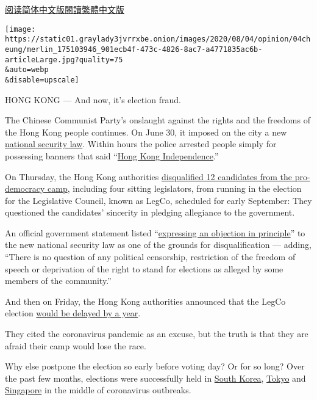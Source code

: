 \href{https://cn.nytimes3xbfgragh.onion/opinion/20200803/hong-kong-election-china/}{阅读简体中文版}\href{https://cn.nytimes3xbfgragh.onion/opinion/20200803/hong-kong-election-china/zh-hant/}{閱讀繁體中文版}

\texttt{[image: https://static01.graylady3jvrrxbe.onion/images/2020/08/04/opinion/04cheung/merlin\_175103946\_901ecb4f-473c-4826-8ac7-a4771835ac6b-articleLarge.jpg?quality=75\\\&auto=webp\\\&disable=upscale]}

HONG KONG --- And now, it's election fraud.

The Chinese Communist Party's onslaught against the rights and the
freedoms of the Hong Kong people continues. On June 30, it imposed on
the city a new
\href{https://www.gld.gov.hk/egazette/pdf/20202448e/egn2020244872.pdf}{national
security law}. Within hours the police arrested people simply for
possessing banners that said
``\href{https://twitter.com/hkpoliceforce/status/1278201222457987073}{Hong
Kong Independence}.''

On Thursday, the Hong Kong authorities
\href{https://www.nytimes3xbfgragh.onion/2020/07/29/world/asia/hong-kong-arrests-security-law.html}{disqualified
12 candidates from the pro-democracy camp}, including four sitting
legislators, from running in the election for the Legislative Council,
known as LegCo, scheduled for early September: They questioned the
candidates' sincerity in pledging allegiance to the government.

An official government statement listed
``\href{https://www.info.gov.hk/gia/general/202007/30/P2020073000481.htm}{expressing
an objection in principle}'' to the new national security law as one of
the grounds for disqualification --- adding, ``There is no question of
any political censorship, restriction of the freedom of speech or
deprivation of the right to stand for elections as alleged by some
members of the community.''

And then on Friday, the Hong Kong authorities announced that the LegCo
election
\href{https://www.nytimes3xbfgragh.onion/2020/07/31/world/asia/hong-kong-election-delayed.html}{would
be delayed by a year}.

They cited the coronavirus pandemic as an excuse, but the truth is that
they are afraid their camp would lose the race.

Why else postpone the election so early before voting day? Or for so
long? Over the past few months, elections were successfully held in
\href{https://www.nytimes3xbfgragh.onion/2020/04/15/world/asia/south-korea-election.html}{South
Korea},
\href{https://www.nytimes3xbfgragh.onion/2020/07/05/world/asia/tokyo-governor-election.html}{Tokyo}
and
\href{https://www.nytimes3xbfgragh.onion/2020/07/10/world/asia/singapore-election-results.html}{Singapore}
in the middle of coronavirus outbreaks.

